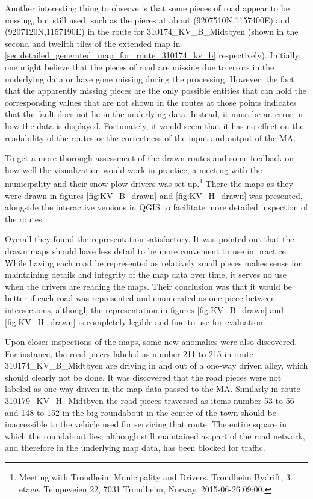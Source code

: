 Another interesting thing to observe is that some pieces of road appear to be missing, but still used, such as the pieces at about (9207510\degree N,1157400\degree E) and (9207120\degree N,1157190\degree E) in the route for 310174\_KV\_B\_Midtbyen (shown in the second and twelfth tiles of the extended map in \ref{sec:detailed_generated_map_for_route_310174_kv_b} respectively). Initially, one might believe that the pieces of road are missing due to errors in the underlying data or have gone missing during the processing. However, the fact that the apparently missing pieces are the only possible entities that can hold the corresponding values that are not shown in the routes at those points indicates that the fault does not lie in the underlying data. Instead, it must be an error in how the data is displayed. Fortunately, it would seem that it has no effect on the readability of the routes or the correctness of the input and output of the MA.

To get a more thorough assessment of the drawn routes and some feedback on how well the visualization would work in practice, a meeting with the municipality and their snow plow drivers was set up.\footnote{Meeting with Trondheim Municipality and Drivers. Trondheim Bydrift, 3. etage, Tempeveien 22, 7031 Trondheim, Norway. 2015-06-26 09:00.} There the maps as they were drawn in figures \ref{fig:KV_B_drawn} and \ref{fig:KV_H_drawn} was presented, alongside the interactive versions in QGIS to facilitate more detailed inspection of the routes.

Overall they found the representation satisfactory. It was pointed out that the drawn maps should have less detail to be more convenient to use in practice. While having each road be represented as relatively small pieces makes sense for maintaining details and integrity of the map data over time, it serves no use when the drivers are reading the maps. Their conclusion was that it would be better if each road was represented and enumerated as one piece between intersections, although the representation in figures \ref{fig:KV_B_drawn} and \ref{fig:KV_H_drawn} is completely legible and fine to use for evaluation.

Upon closer inspections of the maps, some new anomalies were also discovered. For instance, the road pieces labeled as number 211 to 215 in route 310174\_KV\_B\_Midtbyen are driving in and out of a one-way driven alley, which should clearly not be done. It was discovered that the road pieces were not labeled as one way driven in the map data passed to the MA. Similarly in route 310179\_KV\_H\_Midtbyen the road pieces traversed as items number 53 to 56 and 148 to 152 in the big roundabout in the center of the town should be inaccessible to the vehicle used for servicing that route. The entire square in which the roundabout lies, although still maintained as part of the road network, and therefore in the underlying map data, has been blocked for traffic.

